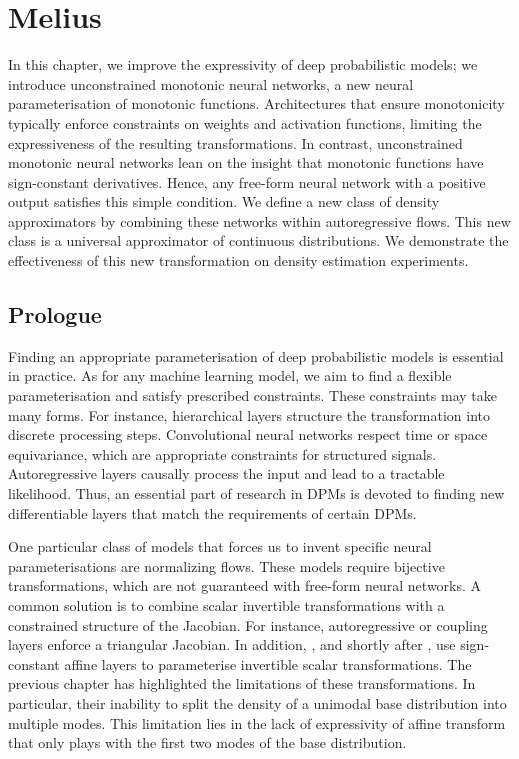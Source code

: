 \chapter{Melius}\label{ch:05}

\begin{chapter_outline}

  In this chapter, we improve the expressivity of deep probabilistic models; we introduce unconstrained monotonic neural networks, a new neural parameterisation of monotonic functions.
  Architectures that ensure monotonicity typically enforce constraints on weights and activation functions, limiting the expressiveness of the resulting transformations.
  In contrast, unconstrained monotonic neural networks lean on the insight that monotonic functions have sign-constant derivatives. Hence, any free-form neural network with a positive output satisfies this simple condition.
  We define a new class of density approximators by combining these networks within autoregressive flows. This new class is a universal approximator of continuous distributions.
  We demonstrate the effectiveness of this new transformation on density estimation experiments.
\end{chapter_outline}

\section{Prologue}
Finding an appropriate parameterisation of deep probabilistic models is essential in practice. As for any machine learning model, we aim to find a flexible parameterisation and satisfy prescribed constraints. These constraints may take many forms. For instance, hierarchical layers structure the transformation into discrete processing steps. Convolutional neural networks respect time or space equivariance, which are appropriate constraints for structured signals. Autoregressive layers causally process the input and lead to a tractable likelihood. Thus, an essential part of research in DPMs is devoted to finding new differentiable layers that match the requirements of certain DPMs.

One particular class of models that forces us to invent specific neural parameterisations are normalizing flows. These models require bijective transformations, which are not guaranteed with free-form neural networks. A common solution is to combine scalar invertible transformations with a constrained structure of the Jacobian. For instance, autoregressive or coupling layers enforce a triangular Jacobian. In addition, \citet{rezende2015variational}, and shortly after \citet{kingma_improved_2016, dinh_density_2017}, use sign-constant affine layers to parameterise invertible scalar transformations. The previous chapter has highlighted the limitations of these transformations. In particular, their inability to split the density of a unimodal base distribution into multiple modes. This limitation lies in the lack of expressivity of affine transform that only plays with the first two modes of the base distribution.

